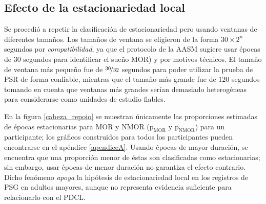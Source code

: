 \documentclass[12pt,letterpaper]{book}
\begin{document}
\subsection*{Efecto de la estacionariedad local}

Se procedió a repetir la clasificación de estacionariedad pero usando ventanas de diferentes tamaños.
%
Los tamaños de ventana se eligieron de la forma $30 \times 2^{n}$ segundos por \textit{compatibilidad}, ya que el protocolo de la AASM sugiere usar épocas de 30 segundos para identificar el sueño MOR) y por motivos técnicos.
%
El tamaño de ventana más pequeño fue de $\nicefrac{30}{32}$ segundos para poder utilizar la prueba de PSR de forma confiable, mientras que el tamaño más grande fue de $120$ segundos tomando en cuenta que ventanas más grandes serían demasiado heterogéneas para considerarse como unidades de estudio fiables.

En la figura \ref{cabeza_repoio} se muestran únicamente las proporciones estimadas de épocas estacionarias para MOR y NMOR ($\text{p}_{\text{MOR}}$ y $\text{p}_{\text{NMOR}}$) para un participante; los gráficos construidos para todos los participantes pueden encontrarse en el apéndice \ref{apendiceA}.
%
Usando épocas de mayor duración, se encuentra que una proporción menor de éstas son clasificadas como estacionarias; sin embargo, usar épocas de menor duración no garantiza el efecto contrario.
%
Dicho fenómeno \textit{apoya} la hipótesis de estacionariedad local en los registros de PSG en adultos mayores, aunque no representa evidencia suficiente para relacionarlo con el PDCL.
\end{document}
